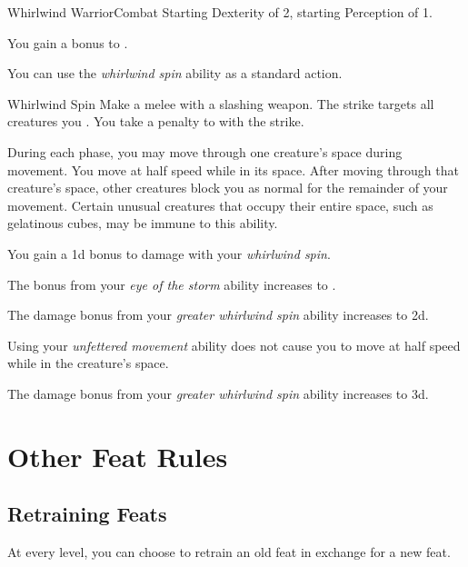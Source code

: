     \begin{feat}{Whirlwind Warrior}{Combat}
        \featpres Starting Dexterity of 2, starting Perception of 1.

         You gain a  bonus to .

         You can use the \textit{whirlwind spin} ability as a standard action.
        \begin{apability}{Whirlwind Spin}
            Make a melee  with a slashing weapon.
            The strike targets all creatures you .
            You take a  penalty to  with the strike.
        \end{apability}

         During each phase, you may move through one creature's space during movement.
        You move at half speed while in its space.
        After moving through that creature's space, other creatures block you as normal for the remainder of your movement.
        Certain unusual creatures that occupy their entire space, such as gelatinous cubes, may be immune to this ability.

         You gain a \plus1d bonus to damage with your \textit{whirlwind spin}.

         The bonus from your \textit{eye of the storm} ability increases to .

         The damage bonus from your \textit{greater whirlwind spin} ability increases to \plus2d.

         Using your \textit{unfettered movement} ability does not cause you to move at half speed while in the creature's space.

         The damage bonus from your \textit{greater whirlwind spin} ability increases to \plus3d.
    \end{feat}

\section{Other Feat Rules}

    \subsection{Retraining Feats}
        At every level, you can choose to retrain an old feat in exchange for a new feat.
